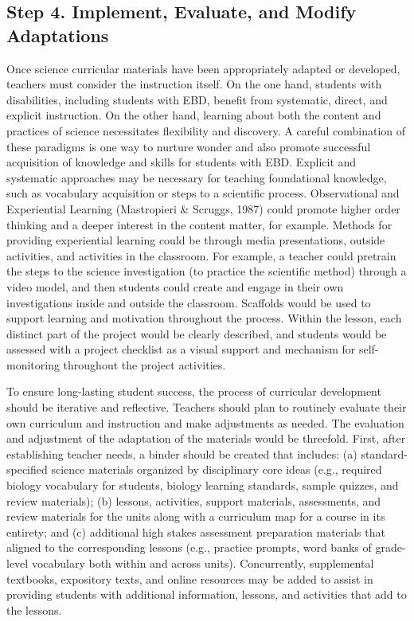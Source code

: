 \documentclass[11.5pt]{sig-alternate} %
\begin{document}
\begin{large}
\subsection*{Step 4. Implement, Evaluate, and Modify Adaptations}

Once science curricular materials have been appropriately adapted or developed, teachers must consider the instruction itself. On the one hand, students with disabilities, including students with EBD, benefit from systematic, direct, and explicit instruction. On the other hand, learning about both the content and practices of science necessitates flexibility and discovery. A careful combination of these paradigms is one way to nurture wonder and also promote successful acquisition of knowledge and skills for students with EBD. Explicit and systematic approaches may be necessary for teaching foundational knowledge, such as vocabulary acquisition or steps to a scientific process. Observational and Experiential Learning (Mastropieri \& Scruggs, 1987) could promote higher order thinking and a deeper interest in the content matter, for example. Methods for providing experiential learning could be through media presentations, outside activities, and activities in the classroom. For example, a teacher could pretrain the steps to the science investigation (to practice the scientific method) through a video model, and then students could create and engage in their own investigations inside and outside the classroom. Scaffolds would be used to support learning and motivation throughout the process. Within the lesson, each distinct part of the project would be clearly described, and students would be assessed with a project checklist as a visual support and mechanism for self-monitoring throughout the project activities.

To ensure long-lasting student success, the process of curricular development should be iterative and reflective. Teachers should plan to routinely evaluate their own curriculum and instruction and make adjustments as needed. The evaluation and adjustment of the adaptation of the materials would be threefold. First, after establishing teacher needs, a binder should be created that includes: (a) standard-specified science materials organized by disciplinary core ideas (e.g., required biology vocabulary for students, biology learning standards, sample quizzes, and review materials); (b) lessons, activities, support materials, assessments, and review materials for the units along with a curriculum map for a course in its entirety; and (c) additional high stakes assessment preparation materials that aligned to the corresponding lessons (e.g., practice prompts, word banks of grade-level vocabulary both within and across units).  Concurrently, supplemental textbooks, expository texts, and online resources may be added to assist in providing students with additional information, lessons, and activities that add to the lessons.


\end{large}
\end{document}
